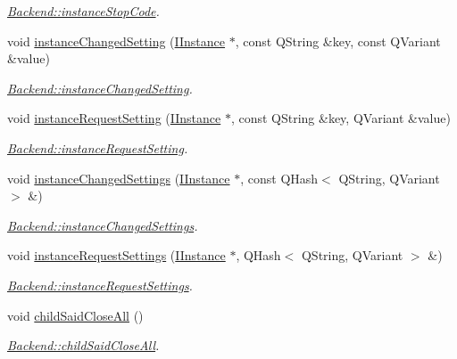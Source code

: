 \begin{DoxyCompactItemize}
\begin{DoxyCompactList}\small\item\em \hyperlink{classBackend_a4baaa487c95ef37472f0ec0aa7b9e682}{Backend\+::instance\+Stop\+Code}. \end{DoxyCompactList}\item 
void \hyperlink{classBackend_a76805ab500231fb990481d14a6e92fa6}{instance\+Changed\+Setting} (\hyperlink{classInstances_1_1IInstance}{I\+Instance} $\ast$, const Q\+String \&key, const Q\+Variant \&value)
\begin{DoxyCompactList}\small\item\em \hyperlink{classBackend_a76805ab500231fb990481d14a6e92fa6}{Backend\+::instance\+Changed\+Setting}. \end{DoxyCompactList}\item 
void \hyperlink{classBackend_a59f35222ca04fc4b47bfcebf1d00e43c}{instance\+Request\+Setting} (\hyperlink{classInstances_1_1IInstance}{I\+Instance} $\ast$, const Q\+String \&key, Q\+Variant \&value)
\begin{DoxyCompactList}\small\item\em \hyperlink{classBackend_a59f35222ca04fc4b47bfcebf1d00e43c}{Backend\+::instance\+Request\+Setting}. \end{DoxyCompactList}\item 
void \hyperlink{classBackend_a05a0cec3dde03eaac9d4007d9d43e69e}{instance\+Changed\+Settings} (\hyperlink{classInstances_1_1IInstance}{I\+Instance} $\ast$, const Q\+Hash$<$ Q\+String, Q\+Variant $>$ \&)
\begin{DoxyCompactList}\small\item\em \hyperlink{classBackend_a05a0cec3dde03eaac9d4007d9d43e69e}{Backend\+::instance\+Changed\+Settings}. \end{DoxyCompactList}\item 
void \hyperlink{classBackend_ab300ebcb08269780d5aca31d4e2e7f96}{instance\+Request\+Settings} (\hyperlink{classInstances_1_1IInstance}{I\+Instance} $\ast$, Q\+Hash$<$ Q\+String, Q\+Variant $>$ \&)
\begin{DoxyCompactList}\small\item\em \hyperlink{classBackend_ab300ebcb08269780d5aca31d4e2e7f96}{Backend\+::instance\+Request\+Settings}. \end{DoxyCompactList}\item 
void \hyperlink{classBackend_aa0c4137f5da3c1cb512b4c2bd65ebe34}{child\+Said\+Close\+All} ()
\begin{DoxyCompactList}\small\item\em \hyperlink{classBackend_aa0c4137f5da3c1cb512b4c2bd65ebe34}{Backend\+::child\+Said\+Close\+All}. \end{DoxyCompactList}\item 

\end{DoxyCompactItemize}
